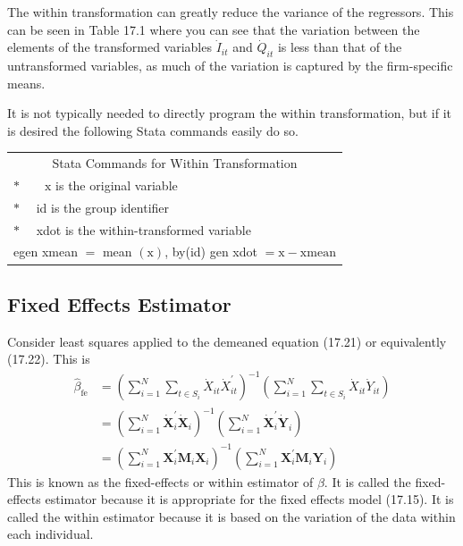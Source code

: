 \documentclass[10pt]{article}
\begin{document}
The within transformation can greatly reduce the variance of the regressors. This can be seen in Table 17.1 where you can see that the variation between the elements of the transformed variables $\dot{I}_{i t}$ and $\dot{Q}_{i t}$ is less than that of the untransformed variables, as much of the variation is captured by the firm-specific means.

It is not typically needed to directly program the within transformation, but if it is desired the following Stata commands easily do so.

\begin{tabular}{l}
\multicolumn{1}{c|}{Stata Commands for Within Transformation} \\
$* \quad \quad \mathrm{x}$ is the original variable \\
$* \quad$ id is the group identifier \\
$* \quad$ xdot is the within-transformed variable \\
egen xmean $=$ mean $(\mathrm{x})$, by(id) gen xdot $=\mathrm{x}-\mathrm{xmean}$ \\
\hline
\end{tabular}

\subsection{Fixed Effects Estimator}
Consider least squares applied to the demeaned equation (17.21) or equivalently (17.22). This is
$$
\begin{aligned}
\widehat{\beta}_{\mathrm{fe}} &=\left(\sum_{i=1}^{N} \sum_{t \in S_{i}} \dot{X}_{i t} \dot{X}_{i t}^{\prime}\right)^{-1}\left(\sum_{i=1}^{N} \sum_{t \in S_{i}} \dot{X}_{i t} \dot{Y}_{i t}\right) \\
&=\left(\sum_{i=1}^{N} \dot{\boldsymbol{X}}_{i}^{\prime} \dot{\boldsymbol{X}}_{i}\right)^{-1}\left(\sum_{i=1}^{N} \dot{\boldsymbol{X}}_{i}^{\prime} \dot{\boldsymbol{Y}}_{i}\right) \\
&=\left(\sum_{i=1}^{N} \boldsymbol{X}_{i}^{\prime} \boldsymbol{M}_{i} \boldsymbol{X}_{i}\right)^{-1}\left(\sum_{i=1}^{N} \boldsymbol{X}_{i}^{\prime} \boldsymbol{M}_{i} \boldsymbol{Y}_{i}\right)
\end{aligned}
$$
This is known as the fixed-effects or within estimator of $\beta$. It is called the fixed-effects estimator because it is appropriate for the fixed effects model (17.15). It is called the within estimator because it is based on the variation of the data within each individual.
\end{document}
